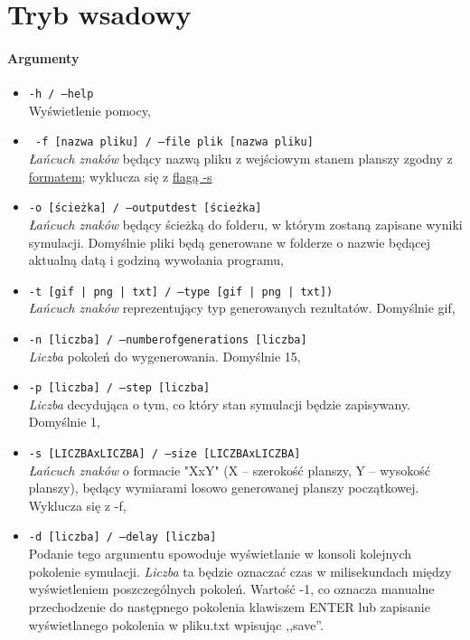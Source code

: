 \documentclass{report}
\begin{document}
\section{Tryb wsadowy}
\paragraph{Argumenty} \label{argumenty}
\begin{itemize}
\item \texttt{-h / --help} \\ Wyświetlenie pomocy,
\item \texttt{ -f [nazwa pliku]  / --file plik [nazwa pliku] } 
	\\ \textit{ Łańcuch znaków }będący nazwą pliku z wejściowym stanem planszy zgodny z \hyperref[format]{\textcolor{LinkColor}{formatem}}; wyklucza się z  \hyperref[s]{\textcolor{LinkColor}{flagą -s}}
\item \texttt{-o [ścieżka] / --output\textunderscore{}dest [ścieżka]}  \\\textit{ Łańcuch znaków }będący ścieżką do folderu, w którym zostaną zapisane wyniki \label{output_dest} symulacji. Domyślnie pliki  będą generowane w folderze  o nazwie będącej aktualną datą i godziną wywołania programu,
\item \texttt{-t [gif | png | txt] / --type [gif | png | txt])} \\\textit{ Łańcuch znaków }reprezentujący typ generowanych rezultatów. Domyślnie gif, \label{output_args}
\item \texttt{-n [liczba] / --number\textunderscore{}of\textunderscore{}generations [liczba]} \\ \textit{ Liczba } pokoleń do wygenerowania. Domyślnie 15,
\item \texttt{-p [liczba] / --step [liczba]} \\ \textit{ Liczba }decydująca o tym, co który stan symulacji będzie zapisywany. Domyślnie 1,
\item \label{s} \texttt{-s [LICZBAxLICZBA] / --size [LICZBAxLICZBA]} \\ \textit{ Łańcuch znaków } o formacie "XxY" (X -- szerokość planszy, Y -- wysokość planszy), będący wymiarami losowo generowanej planszy początkowej. Wyklucza się z -f, 
\item \label{delay} \texttt{-d [liczba] / --delay [liczba]} \\ Podanie tego argumentu spowoduje wyświetlanie w konsoli kolejnych pokolenie symulacji. \textit{ Liczba } ta będzie oznaczać czas  w milisekundach między wyświetleniem poszczególnych pokoleń. Wartość -1, co oznacza manualne przechodzenie do następnego pokolenia klawiszem ENTER lub zapisanie wyświetlanego pokolenia w pliku.txt wpisując ,,save''.
\end{itemize}
\end{document}
